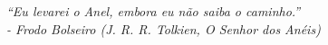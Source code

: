 \begin{epigrafe}
    \vspace*{\fill}
	\begin{flushright}
		\textit{``Eu levarei o Anel, embora eu não saiba o caminho.''\\
		- Frodo Bolseiro (J. R. R. Tolkien, O Senhor dos Anéis)}
	\end{flushright}
\end{epigrafe}
